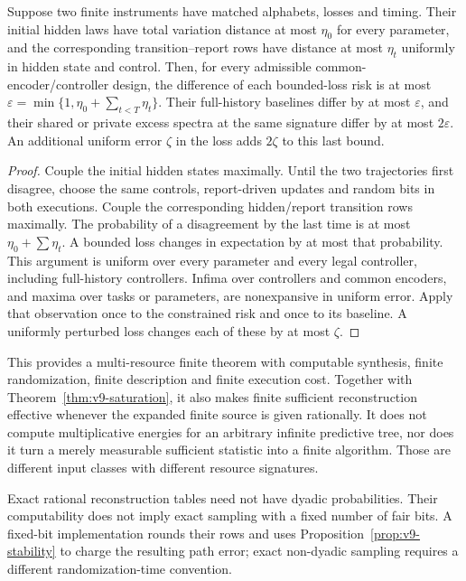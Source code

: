 \begin{proposition}\label{prop:v9-stability}
Suppose two finite instruments have matched alphabets, losses and timing.
Their initial hidden laws have total variation distance at most $\eta_0$
for every parameter, and the corresponding transition--report rows have
distance at most $\eta_t$ uniformly in hidden state and control. Then,
for every admissible common-encoder/controller design, the difference
of each bounded-loss risk is at most
$\varepsilon=\min\{1,\eta_0+\sum_{t<T}\eta_t\}$.
Their full-history baselines differ by at most $\varepsilon$, and their
shared or private excess spectra at the same signature differ by at most
$2\varepsilon$. An additional uniform error $\zeta$ in the loss adds
$2\zeta$ to this last bound.
\end{proposition}
\begin{proof}
Couple the initial hidden states maximally. Until the two trajectories
first disagree, choose the same controls, report-driven updates and
random bits in both executions. Couple the corresponding hidden/report
transition rows maximally. The probability of a disagreement by the last
time is at most $\eta_0+\sum\eta_t$. A bounded loss changes in expectation
by at most that probability. This argument is uniform over every
parameter and every legal controller, including full-history controllers.
Infima over controllers and common encoders, and maxima over tasks or
parameters, are nonexpansive in uniform error. Apply that observation
once to the constrained risk and once to its baseline. A uniformly
perturbed loss changes each of these by at most $\zeta$.
\end{proof}

This provides a multi-resource finite theorem with computable synthesis,
finite randomization, finite description and finite execution cost.
Together with Theorem~\ref{thm:v9-saturation}, it also makes finite
sufficient reconstruction effective whenever the expanded finite source
is given rationally. It does not compute multiplicative energies for an
arbitrary infinite predictive tree, nor does it turn a merely measurable
sufficient statistic into a finite algorithm. Those are different input
classes with different resource signatures.

Exact rational reconstruction tables need not have dyadic probabilities.
Their computability does not imply exact sampling with a fixed number
of fair bits. A fixed-bit implementation rounds their rows and uses
Proposition~\ref{prop:v9-stability} to charge the resulting path error;
exact non-dyadic sampling requires a different randomization-time convention.
